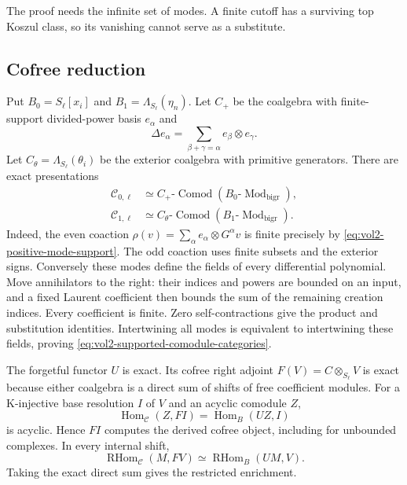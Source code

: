 The proof needs the infinite set of modes. A finite cutoff has
a surviving top Koszul class, so its vanishing cannot serve as
a substitute.

\subsection{Cofree reduction}

Put \(B_0=S_\ell[x_i]\) and \(B_1=\Lambda_{S_\ell}(\eta_n)\).
Let \(C_+\) be the coalgebra with finite-support divided-power
basis \(e_\alpha\) and
\[
 \Delta e_\alpha=\sum_{\beta+\gamma=\alpha}
                         e_\beta\otimes e_\gamma.
\]
Let \(C_\theta=\Lambda_{S_\ell}(\theta_i)\) be the exterior
coalgebra with primitive generators. There are exact
presentations
\begin{equation}\label{eq:vol2-supported-comodule-categories}
 \begin{aligned}
 \mathcal C_{0,\ell}&\simeq
 C_+\text{-}\operatorname{Comod}(B_0\text{-}\operatorname{Mod}_{\mathrm{bigr}}),\\
 \mathcal C_{1,\ell}&\simeq
 C_\theta\text{-}\operatorname{Comod}(B_1\text{-}\operatorname{Mod}_{\mathrm{bigr}}).
 \end{aligned}
\end{equation}
Indeed, the even coaction
\(\rho(v)=\sum_\alpha e_\alpha\otimes G^\alpha v\) is finite
precisely by \eqref{eq:vol2-positive-mode-support}. The odd
coaction uses finite subsets and the exterior signs.
Conversely these modes define the fields of every differential
polynomial. Move annihilators to the right: their indices and
powers are bounded on an input, and a fixed Laurent coefficient
then bounds the sum of the remaining creation indices.
Every coefficient is finite. Zero self-contractions give the
product and substitution identities. Intertwining all modes
is equivalent to intertwining these fields, proving
\eqref{eq:vol2-supported-comodule-categories}.

The forgetful functor \(U\) is exact. Its cofree right adjoint
\(F(V)=C\otimes_{S_\ell}V\) is exact because either coalgebra
is a direct sum of shifts of free coefficient modules.
For a K-injective base resolution \(I\) of \(V\) and an
acyclic comodule \(Z\),
\[
 \operatorname{Hom}_{\mathcal C}(Z,FI)
 =\operatorname{Hom}_{B}(UZ,I)
\]
is acyclic. Hence \(FI\) computes the derived cofree object,
including for unbounded complexes. In every internal shift,
\begin{equation}\label{eq:vol2-cofree-derived-adjunction}
 \operatorname{RHom}_{\mathcal C}(M,FV)
 \simeq\operatorname{RHom}_{B}(UM,V).
\end{equation}
Taking the exact direct sum gives the restricted enrichment.

